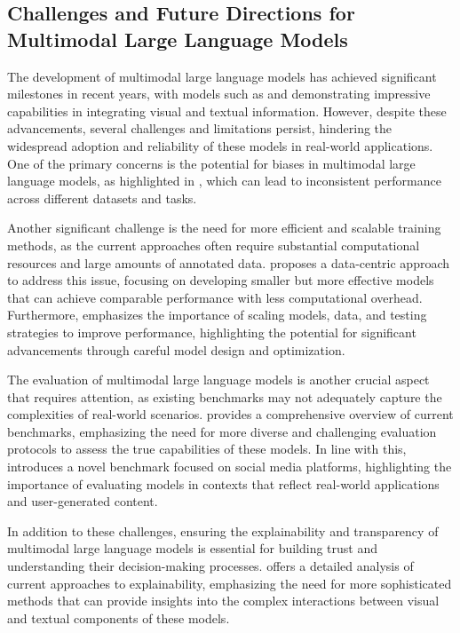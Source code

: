 \documentclass[11pt,a4paper]{article}
\begin{document}
\subsection{Challenges and Future Directions for Multimodal Large Language Models}


The development of multimodal large language models has achieved significant milestones in recent years, with models such as \cite{arxiv:1411.2539} and \cite{arxiv:1611.08321} demonstrating impressive capabilities in integrating visual and textual information. However, despite these advancements, several challenges and limitations persist, hindering the widespread adoption and reliability of these models in real-world applications. One of the primary concerns is the potential for biases in multimodal large language models, as highlighted in \cite{arxiv:2212.08044}, which can lead to inconsistent performance across different datasets and tasks.

Another significant challenge is the need for more efficient and scalable training methods, as the current approaches often require substantial computational resources and large amounts of annotated data. \cite{arxiv:2402.11530} proposes a data-centric approach to address this issue, focusing on developing smaller but more effective models that can achieve comparable performance with less computational overhead. Furthermore, \cite{arxiv:2412.05271} emphasizes the importance of scaling models, data, and testing strategies to improve performance, highlighting the potential for significant advancements through careful model design and optimization.

The evaluation of multimodal large language models is another crucial aspect that requires attention, as existing benchmarks may not adequately capture the complexities of real-world scenarios. \cite{arxiv:2408.08632} provides a comprehensive overview of current benchmarks, emphasizing the need for more diverse and challenging evaluation protocols to assess the true capabilities of these models. In line with this, \cite{arxiv:2402.14154} introduces a novel benchmark focused on social media platforms, highlighting the importance of evaluating models in contexts that reflect real-world applications and user-generated content.

In addition to these challenges, ensuring the explainability and transparency of multimodal large language models is essential for building trust and understanding their decision-making processes. \cite{arxiv:2412.02104} offers a detailed analysis of current approaches to explainability, emphasizing the need for more sophisticated methods that can provide insights into the complex interactions between visual and textual components of these models.
\end{document}
